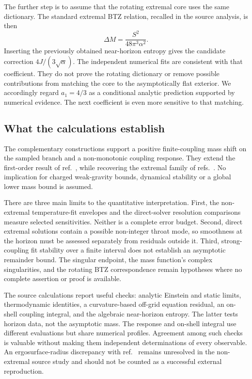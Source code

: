 \documentclass[11pt,a4paper]{article}
\begin{document}
The further step is to assume that the rotating extremal core uses the same dictionary. The standard extremal BTZ relation, recalled in the source analysis, is then
\begin{equation}
 \Delta M=\frac{S^2}{48\pi^3\alpha^2}.
 \label{eq:btz}
\end{equation}
Inserting the previously obtained near-horizon entropy gives the candidate correction $4J/(3\sqrt\alpha)$. The independent numerical fits are consistent with that coefficient. They do not prove the rotating dictionary or remove possible contributions from matching the core to the asymptotically flat exterior. We accordingly regard $a_1=4/3$ as a conditional analytic prediction supported by numerical evidence. The next coefficient is even more sensitive to that matching.

\subsection{What the calculations establish}
The complementary constructions support a positive finite-coupling mass shift on the sampled branch and a non-monotonic coupling response. They extend the first-order result of ref.~\cite{Ma2020}, while recovering the extremal family of refs.~\cite{Brihaye2010,KKR2023}. No implication for charged weak-gravity bounds, dynamical stability or a global lower mass bound is assumed.

There are three main limits to the quantitative interpretation. First, the non-extremal temperature-fit envelopes and the direct-solver resolution comparisons measure selected sensitivities. Neither is a complete error budget. Second, direct extremal solutions contain a possible non-integer throat mode, so smoothness at the horizon must be assessed separately from residuals outside it. Third, strong-coupling fit stability over a finite interval does not establish an asymptotic remainder bound. The singular endpoint, the mass function's complex singularities, and the rotating BTZ correspondence remain hypotheses where no complete assertion or proof is available.

The source calculations report useful checks: analytic Einstein and static limits, thermodynamic identities, a curvature-based off-grid equation residual, an on-shell coupling integral, and the algebraic near-horizon entropy. The latter tests horizon data, not the asymptotic mass. The response and on-shell integral use different evaluations but share numerical profiles. Agreement among such checks is valuable without making them independent determinations of every observable. An ergosurface-radius discrepancy with ref.~\cite{Brihaye2010} remains unresolved in the non-extremal source study and should not be counted as a successful external reproduction.
\end{document}
